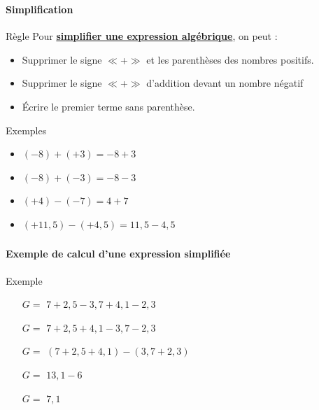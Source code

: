 \documentclass{beamer}
\begin{document}
\begin{frame}
	\frametitle{} %
	\framesubtitle{Simplification }	
	
	\begin{block}{Règle}
		Pour \textbf{\underline{simplifier une expression algébrique}}, on peut :
		\begin{itemize}
			\item Supprimer le signe $\ll$+$\gg$ et les parenthèses des nombres positifs. 
			\item Supprimer le signe $\ll$+$\gg$ d'addition devant un nombre négatif
			\item \'Ecrire le premier terme sans parenthèse.
		\end{itemize}
	\end{block}
	
	\begin{exampleblock}{Exemples}
		
		\begin{itemize}
			\item $(-8) + (+3) = -8 + 3$
			\item $(-8) + (-3) = -8 -3 $
			\item $ (+4) - (-7) = 4 + 7$
			\item $ (+11,5) - (+4,5) = 11,5 - 4,5$ 
		\end{itemize}
	\end{exampleblock}
\end{frame}

\begin{frame}
	\frametitle{} %
	\framesubtitle{Exemple de calcul d'une expression simplifiée}	
	
	
	\begin{exampleblock}{Exemple}
		\begin{itemize}
			\item[$G=$] $7 + 2,5 - 3,7 + 4,1 - 2,3$
			\item[$G=$] $7 + 2,5 + 4,1 - 3,7 - 2,3$
			\item[$G=$] $(7 + 2,5 + 4,1) - (3,7 + 2,3)$
			\item[$G=$] $13,1 - 6$
			\item[$G=$] $ 7,1 $
		\end{itemize}		
	\end{exampleblock}
	
\end{frame}
\end{document}
